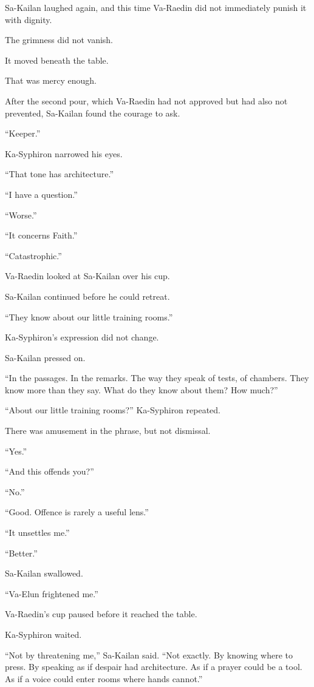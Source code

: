 Sa-Kailan laughed again, and this time Va-Raedin did not immediately punish it with dignity.\par
The grimness did not vanish.\par
It moved beneath the table.\par
That was mercy enough.\par
After the second pour, which Va-Raedin had not approved but had also not prevented, Sa-Kailan found the courage to ask.\par
“Keeper.”\par
Ka-Syphiron narrowed his eyes.\par
“That tone has architecture.”\par
“I have a question.”\par
“Worse.”\par
“It concerns Faith.”\par
“Catastrophic.”\par
Va-Raedin looked at Sa-Kailan over his cup.\par
Sa-Kailan continued before he could retreat.\par
“They know about our little training rooms.”\par
Ka-Syphiron’s expression did not change.\par
Sa-Kailan pressed on.\par
“In the passages. In the remarks. The way they speak of tests, of chambers. They know more than they say. What do they know about them? How much?”\par
“About our little training rooms?” Ka-Syphiron repeated.\par
There was amusement in the phrase, but not dismissal.\par
“Yes.”\par
“And this offends you?”\par
“No.”\par
“Good. Offence is rarely a useful lens.”\par
“It unsettles me.”\par
“Better.”\par
Sa-Kailan swallowed.\par
“Va-Elun frightened me.”\par
Va-Raedin’s cup paused before it reached the table.\par
Ka-Syphiron waited.\par
“Not by threatening me,” Sa-Kailan said. “Not exactly. By knowing where to press. By speaking as if despair had architecture. As if a prayer could be a tool. As if a voice could enter rooms where hands cannot.”\par
